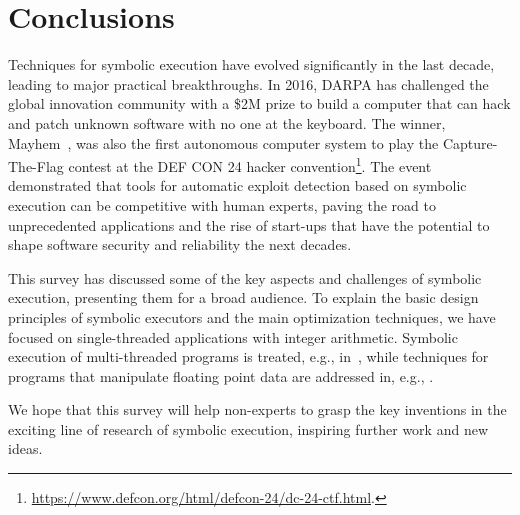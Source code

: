 
\section{Conclusions}
\label{se:conclusions}

Techniques for symbolic execution have evolved significantly in the last decade, leading to major practical breakthroughs. In 2016, DARPA has challenged the global innovation community with a \$2M prize to build a computer that can hack and patch unknown software with no one at the keyboard. The winner, {\sc Mayhem}~\cite{MAYHEM-SP12}, was also the first autonomous computer system to play the Capture-The-Flag contest at the DEF CON 24 hacker convention\footnote{\url{https://www.defcon.org/html/defcon-24/dc-24-ctf.html}.}. The event demonstrated that tools for automatic exploit detection based on symbolic execution can be competitive with human experts, paving the road to unprecedented applications and the rise of start-ups that have the potential to shape software security and reliability the next decades. 

This survey has discussed some of the key aspects and challenges of symbolic execution, presenting them for a broad audience. To explain the basic design principles of symbolic executors and the main optimization techniques, we have focused on single-threaded applications with integer arithmetic. Symbolic execution of multi-threaded programs is treated, e.g., in~\cite{KPV-TACAS03,SA-HVC06,CLOUD9-EUROSYS11,FHR-ESEC13,BGC-OOPSLA14,GKW-ESEC15}, while techniques for programs that manipulate floating point data are addressed in, e.g., \cite{M-STVR01,BGM-STVR06,LTH-ICTSS10,CCK-EUROSYS11,BVL-POPL13,CCK-TSE14,RPW-SIGSOFT15}.

We hope that this survey will help non-experts to grasp the key inventions in the exciting line of research of symbolic execution, inspiring further work and new ideas.
